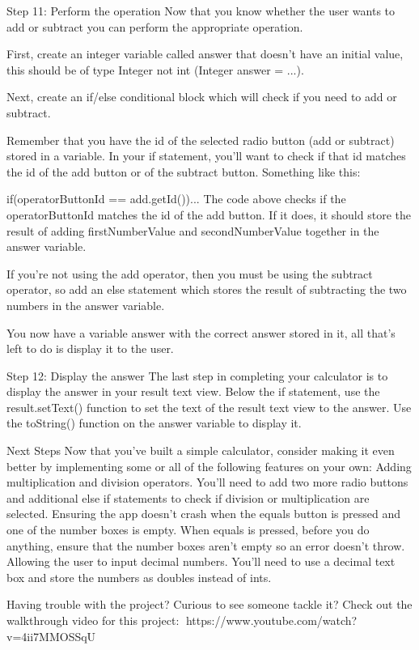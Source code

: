     Step 11: Perform the operation
        Now that you know whether the user wants to add or subtract you can perform the appropriate operation.

        First, create an integer variable called answer that doesn’t have an initial value, this should be of type Integer not int (Integer answer = ...).

        Next, create an if/else conditional block which will check if you need to add or subtract.

        Remember that you have the id of the selected radio button (add or subtract) stored in a variable. In your if statement, you’ll want to check if that id matches the id of the add button or of the subtract button. Something like this:

        if(operatorButtonId == add.getId()){...}
        The code above checks if the operatorButtonId matches the id of the add button. If it does, it should store the result of adding firstNumberValue and secondNumberValue together in the answer variable.

        If you’re not using the add operator, then you must be using the subtract operator, so add an else statement which stores the result of subtracting the two numbers in the answer variable.

        You now have a variable answer with the correct answer stored in it, all that’s left to do is display it to the user.

    Step 12: Display the answer
        The last step in completing your calculator is to display the answer in your result text view. Below the if statement, use the result.setText() function to set the text of the result text view to the answer. Use the toString() function on the answer variable to display it.

Next Steps
    Now that you’ve built a simple calculator, consider making it even better by implementing some or all of the following features on your own:
        Adding multiplication and division operators.
                You’ll need to add two more radio buttons and additional else if statements to check if division or multiplication are selected.
        Ensuring the app doesn’t crash when the equals button is pressed and one of the number boxes is empty.
            When equals is pressed, before you do anything, ensure that the number boxes aren’t empty so an error doesn’t throw.
        Allowing the user to input decimal numbers.
            You’ll need to use a decimal text box and store the numbers as doubles instead of ints.

    Having trouble with the project? Curious to see someone tackle it? Check out the walkthrough video for this project:
        🔗https://www.youtube.com/watch?v=4ii7MMOSSqU

